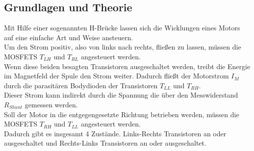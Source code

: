 \subsection{Grundlagen und Theorie}

Mit Hilfe einer sogenannten H-Brücke lassen sich die Wicklungen eines
Motors auf eine einfache Art und Weise ansteuern.\\

Um den Strom positiv, also von links nach rechts, fließen zu lassen,
müssen die MOSFETS $T_{LH}$ und $T_{RL}$ angesteuert werden.\\

Wenn diese beiden besagten Transistoren ausgeschaltet werden, treibt die Energie im
Magnetfeld der Spule den Strom weiter. Dadurch fließt der Motorstrom $I_M$
durch die parasitären Bodydioden der Transistoren $T_{LL}$ und $T_{RH}$.\\

Dieser Strom kann indirekt durch die Spannung die über den Messwiderstand
$R_{Shunt}$ gemessen werden.\\

Soll der Motor in die entgegengesetzte Richtung betrieben werden, müssen
die MOSFETS $T_{RH}$ und $T_{LL}$ angesteuert werden.\\

Dadurch gibt es insgesamt 4 Zustände. Links-Rechts Transistoren an oder
ausgeschaltet und Rechts-Links Transistoren an oder ausgeschaltet.










